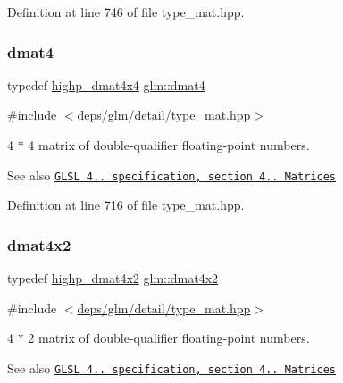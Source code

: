 Definition at line 746 of file type\+\_\+mat.\+hpp.

\mbox{\label{group__core__types_ga7f7c1300ebfd19d573e9deb1e8758b54}} 
\subsubsection{\texorpdfstring{dmat4}{dmat4}}
{\footnotesize\ttfamily typedef \hyperlink{group__core__precision_gad3df38df8c4f7ef9b38f03581ff60142}{highp\+\_\+dmat4x4} \hyperlink{group__core__types_ga7f7c1300ebfd19d573e9deb1e8758b54}{glm\+::dmat4}}



{\ttfamily \#include $<$\hyperlink{type__mat_8hpp}{deps/glm/detail/type\+\_\+mat.\+hpp}$>$}

4 $\ast$ 4 matrix of double-\/qualifier floating-\/point numbers.

\begin{DoxySeeAlso}{See also}
\href{http://www.opengl.org/registry/doc/GLSLangSpec.4.20.8.pdf}{\tt G\+L\+SL 4.. specification, section 4.. Matrices} 
\end{DoxySeeAlso}


Definition at line 716 of file type\+\_\+mat.\+hpp.

\mbox{\label{group__core__types_gab3d51ce41e6f0aa267d3e185cee09c44}} 
\subsubsection{\texorpdfstring{dmat4x2}{dmat4x2}}
{\footnotesize\ttfamily typedef \hyperlink{group__core__precision_ga22c6b4fe5bb2e33a3cfa1c026803dd68}{highp\+\_\+dmat4x2} \hyperlink{group__core__types_gab3d51ce41e6f0aa267d3e185cee09c44}{glm\+::dmat4x2}}



{\ttfamily \#include $<$\hyperlink{type__mat_8hpp}{deps/glm/detail/type\+\_\+mat.\+hpp}$>$}

4 $\ast$ 2 matrix of double-\/qualifier floating-\/point numbers.

\begin{DoxySeeAlso}{See also}
\href{http://www.opengl.org/registry/doc/GLSLangSpec.4.20.8.pdf}{\tt G\+L\+SL 4.. specification, section 4.. Matrices} 
\end{DoxySeeAlso}


